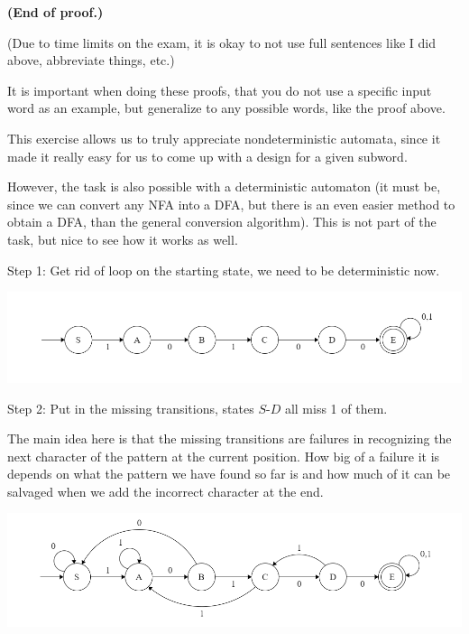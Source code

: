 \textbf{(End of proof.)}

(Due to time limits on the exam, it is okay to not use full sentences like I did above, abbreviate things, etc.)

It is important when doing these proofs, that you do not use a specific input word as an example, but generalize to any possible words, like the proof above.


This exercise allows us to truly appreciate nondeterministic automata, since it made it really easy for us to come up with a design for a given subword.

However, the task is also possible with a deterministic automaton (it must be, since we can convert any NFA into a DFA, but there is an even easier method to obtain a DFA, than the general conversion algorithm). This is not part of the task, but nice to see how it works as well.

Step 1: Get rid of loop on the starting state, we need to be deterministic now.

\includegraphics[width=\linewidth]{02/det_10100_1.png}

Step 2: Put in the missing transitions, states $S$-$D$ all miss 1 of them.

The main idea here is that the missing transitions are failures in recognizing the next character of the pattern at the current position. How big of a failure it is depends on what the pattern we have found so far is and how much of it can be salvaged when we add the incorrect character at the end.

\includegraphics[width=\linewidth]{02/det_10100_2.png}

